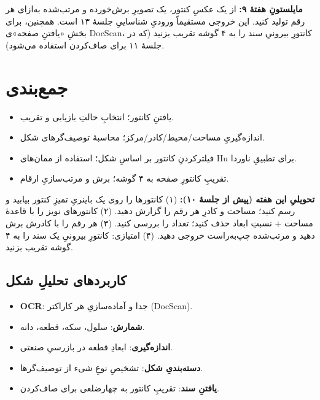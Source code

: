 \documentclass[12pt,a4paper]{article}
\begin{document}
\begin{yaddasht}
\textbf{مایلستونِ هفتهٔ ۹:} از یک عکسِ کنتور، یک تصویرِ برش‌خورده و مرتب‌شده به‌ازای هر رقم تولید
کنید. این خروجی مستقیماً ورودیِ شناساییِ جلسهٔ ۱۳ است. همچنین، برای بخشِ «یافتنِ صفحه»ی DocScan،
کانتورِ بیرونیِ سند را به ۴ گوشه تقریب بزنید (که در جلسهٔ ۱۱ برای صاف‌کردن استفاده می‌شود).
\end{yaddasht}

\section{جمع‌بندی}

\begin{itemize}
  \item یافتنِ کانتور؛ انتخابِ حالتِ بازیابی و تقریب.
  \item اندازه‌گیریِ مساحت/محیط/کادر/مرکز؛ محاسبهٔ توصیف‌گرهای شکل.
  \item فیلترکردنِ کانتور بر اساسِ شکل؛ استفاده از ممان‌های Hu برای تطبیقِ ناوردا.
  \item تقریبِ کانتورِ صفحه به ۴ گوشه؛ برش و مرتب‌سازیِ ارقام.
\end{itemize}

\begin{tamrin}
\textbf{تحویلیِ این هفته (پیش از جلسهٔ ۱۰):} (۱) کانتورها را روی یک باینریِ تمیزِ کنتور بیابید و
رسم کنید؛ مساحت و کادرِ هر رقم را گزارش دهید. (۲) کانتورهای نویز را با قاعدهٔ مساحت + نسبتِ ابعاد
حذف کنید؛ تعداد را بررسی کنید. (۳) هر رقم را با کادرش برش دهید و مرتب‌شده چپ‌به‌راست خروجی دهید.
(۴) امتیازی: کانتورِ بیرونیِ یک سند را به ۴ گوشه تقریب بزنید.
\end{tamrin}

\subsection*{کاربردهای تحلیلِ شکل}

\begin{itemize}
  \item \textbf{OCR}: جدا و آماده‌سازیِ هر کاراکتر (DocScan).
  \item \textbf{شمارش}: سلول، سکه، قطعه، دانه.
  \item \textbf{اندازه‌گیری}: ابعادِ قطعه در بازرسیِ صنعتی.
  \item \textbf{دسته‌بندیِ شکل}: تشخیصِ نوعِ شیء از توصیف‌گرها.
  \item \textbf{یافتنِ سند}: تقریبِ کانتور به چهارضلعی برای صاف‌کردن.
\end{itemize}
\end{document}
